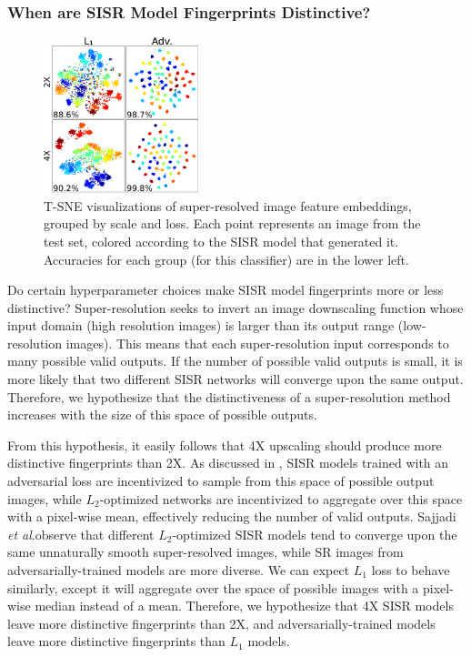 \documentclass[10pt]{article} %
\newcommand{\etal}{\textit{et al}.}
\begin{document}
\subsubsection{When are SISR Model Fingerprints Distinctive?}
\label{sec:scale_and_loss}

\begin{figure}
    \vspace{-1em}
    \includegraphics[width=0.4\textwidth]{figures/model-tsne.pdf}
    \caption{T-SNE visualizations of super-resolved image feature embeddings, grouped by scale and loss. Each point represents an image from the test set, colored according to the SISR model that generated it. Accuracies for each group (for this classifier) are in the lower left.}
    \label{fig:custom_tsne}
\end{figure}

Do certain hyperparameter choices make SISR model fingerprints more or less distinctive? Super-resolution seeks to invert an image downscaling function whose input domain (high resolution images) is larger than its output range (low-resolution images). This means that each super-resolution input corresponds to many possible valid outputs. If the number of possible valid outputs is small, it is more likely that two different SISR networks will converge upon the same output. Therefore, we hypothesize that the distinctiveness of a super-resolution method increases with the size of this space of possible outputs.

From this hypothesis, it easily follows that 4X upscaling should produce more distinctive fingerprints than 2X. As discussed in \cite{sajjadi2016enhancenet}, SISR models trained with an adversarial loss are incentivized to sample from this space of possible output images, while $L_2$-optimized networks are incentivized to aggregate over this space with a pixel-wise mean, effectively reducing the number of valid outputs. Sajjadi \etal observe that different $L_2$-optimized SISR models tend to converge upon the same unnaturally smooth super-resolved images, while SR images from adversarially-trained models
are more diverse. We can expect $L_1$ loss to behave similarly, except it will aggregate over the space of possible images with a pixel-wise median instead of a mean. Therefore, we  hypothesize  that  4X  SISR  models  leave  more  distinctive  fingerprints  than  2X,  and adversarially-trained models leave more distinctive fingerprints than $L_1$ models.
\end{document}
